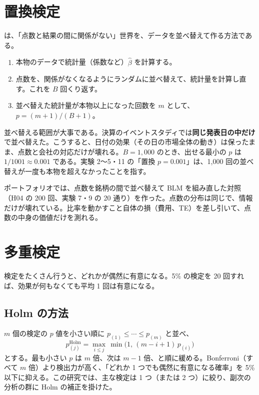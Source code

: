 \section{置換検定}

は、「点数と結果の間に関係がない」世界を、データを並べ替えて作る方法である。

\begin{enumerate}
\item 本物のデータで統計量（係数など）$\hat\beta$ を計算する。
\item 点数を、関係がなくなるようにランダムに並べ替えて、統計量を計算し直す。これを $B$ 回くり返す。
\item 並べ替えた統計量が本物以上になった回数を $m$ として、$p = (m+1)/(B+1)$。
\end{enumerate}

並べ替える範囲が大事である。決算のイベントスタディでは\textbf{同じ発表日の中だけ}で並べ替えた。こうすると、日付の効果（その日の市場全体の動き）は保ったまま、点数と会社の対応だけが壊れる。$B=1{,}000$ のとき、出せる最小の $p$ は $1/1001\approx0.001$ である。実験 2〜5・11 の「置換 $p=0.001$」は、1,000 回の並べ替えが一度も本物を超えなかったことを指す。

ポートフォリオでは、点数を銘柄の間で並べ替えて BLM を組み直した対照（H04 の 200 回、実験 7・9 の 20 通り）を作った。点数の分布は同じで、情報だけが壊れている。比率を動かすこと自体の損（費用、TE）を差し引いて、点数の中身の価値だけを測れる。

\section{多重検定}

検定をたくさん行うと、どれかが偶然に有意になる。5\% の検定を 20 回すれば、効果が何もなくても平均 1 回は有意になる。

\subsection{Holm の方法}

$m$ 個の検定の $p$ 値を小さい順に $p_{(1)}\le\cdots\le p_{(m)}$ と並べ、
\begin{equation}
p^{\text{Holm}}_{(j)} = \max_{i\le j}\,\min\bigl(1,\,(m-i+1)\,p_{(i)}\bigr)
\end{equation}
とする。最も小さい $p$ は $m$ 倍、次は $m-1$ 倍、と順に緩める。Bonferroni（すべて $m$ 倍）より検出力が高く、「どれか 1 つでも偶然に有意になる確率」を 5\% 以下に抑える。この研究では、主な検定は 1 つ（または 2 つ）に絞り、副次の分析の群に Holm の補正を掛けた。

